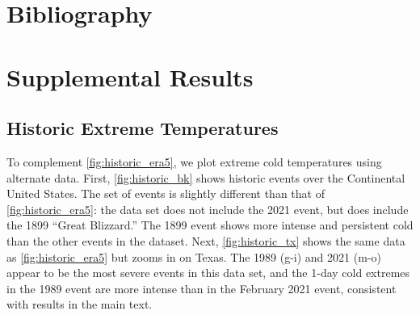 \documentclass[12pt]{iopart}
\begin{document}
\section*{Bibliography}



\clearpage
\appendix
\section{Supplemental Results}
\renewcommand{\thefigure}{S\arabic{figure}}
\setcounter{figure}{0}

\subsection{Historic Extreme Temperatures}

To complement \cref{fig:historic_era5}, we plot extreme cold temperatures using alternate data.
First, \cref{fig:historic_bk} shows historic events over the Continental United States.
The set of events is slightly different than that of \cref{fig:historic_era5}: the data set does not include the 2021 event, but does include the 1899 ``Great Blizzard.''
The 1899 event shows more intense and persistent cold than the other events in the dataset.
Next, \cref{fig:historic_tx} shows the same data as \cref{fig:historic_era5} but zooms in on Texas.
The 1989 (g-i) and 2021 (m-o) appear to be the most severe events in this data set, and the 1-day cold extremes in the 1989 event are more intense than in the February 2021 event, consistent with results in the main text.
\end{document}
